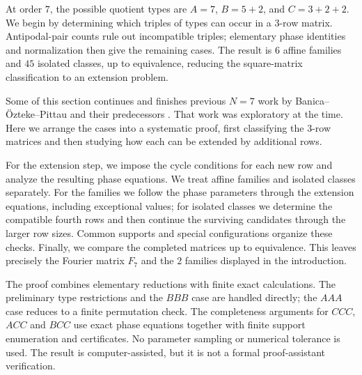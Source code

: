 \documentclass[11pt,a4paper]{article}
\theoremstyle{plain}
\theoremstyle{definition}
\numberwithin{equation}{section}
\begin{document}
At order $7$, the possible quotient types are $A=7$, $B=5+2$, and $C=3+2+2$. We begin by determining which triples of types can occur in a $3$-row matrix. Antipodal-pair counts rule out incompatible triples; elementary phase identities and normalization then give the remaining cases. The result is $6$ affine families and $45$ isolated classes, up to equivalence, reducing the square-matrix classification to an extension problem.

Some of this section continues and finishes previous $N=7$ work by Banica--\"Ozteke--Pittau and their predecessors \cite{bbs,bop}. That work was exploratory at the time. Here we arrange the cases into a systematic proof, first classifying the $3$-row matrices and then studying how each can be extended by additional rows.

For the extension step, we impose the cycle conditions for each new row and analyze the resulting phase equations. We treat affine families and isolated classes separately. For the families we follow the phase parameters through the extension equations, including exceptional values; for isolated classes we determine the compatible fourth rows and then continue the surviving candidates through the larger row sizes. Common supports and special configurations organize these checks. Finally, we compare the completed matrices up to equivalence. This leaves precisely the Fourier matrix $F_7$ and the $2$ families displayed in the introduction.

The proof combines elementary reductions with finite exact calculations. The preliminary type restrictions and the $BBB$ case are handled directly; the $AAA$ case reduces to a finite permutation check. The completeness arguments for $CCC$, $ACC$ and $BCC$ use exact phase equations together with finite support enumeration and certificates. No parameter sampling or numerical tolerance is used. The result is computer-assisted, but it is not a formal proof-assistant verification.
\end{document}
